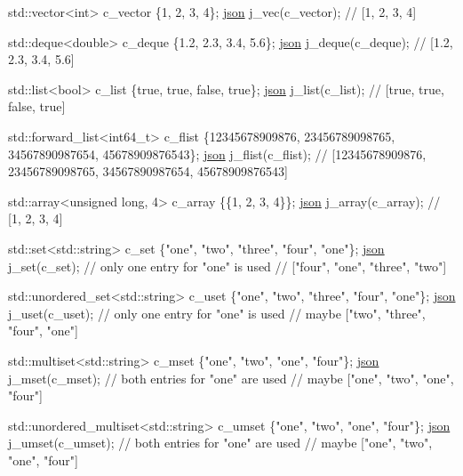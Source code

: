 \begin{DoxyCode}
std::vector<int> c\_vector \{1, 2, 3, 4\};
\hyperlink{classnlohmann_1_1basic__json}{json} j\_vec(c\_vector);
\textcolor{comment}{// [1, 2, 3, 4]}

std::deque<double> c\_deque \{1.2, 2.3, 3.4, 5.6\};
\hyperlink{classnlohmann_1_1basic__json}{json} j\_deque(c\_deque);
\textcolor{comment}{// [1.2, 2.3, 3.4, 5.6]}

std::list<bool> c\_list \{\textcolor{keyword}{true}, \textcolor{keyword}{true}, \textcolor{keyword}{false}, \textcolor{keyword}{true}\};
\hyperlink{classnlohmann_1_1basic__json}{json} j\_list(c\_list);
\textcolor{comment}{// [true, true, false, true]}

std::forward\_list<int64\_t> c\_flist \{12345678909876, 23456789098765, 34567890987654, 45678909876543\};
\hyperlink{classnlohmann_1_1basic__json}{json} j\_flist(c\_flist);
\textcolor{comment}{// [12345678909876, 23456789098765, 34567890987654, 45678909876543]}

std::array<unsigned long, 4> c\_array \{\{1, 2, 3, 4\}\};
\hyperlink{classnlohmann_1_1basic__json}{json} j\_array(c\_array);
\textcolor{comment}{// [1, 2, 3, 4]}

std::set<std::string> c\_set \{\textcolor{stringliteral}{"one"}, \textcolor{stringliteral}{"two"}, \textcolor{stringliteral}{"three"}, \textcolor{stringliteral}{"four"}, \textcolor{stringliteral}{"one"}\};
\hyperlink{classnlohmann_1_1basic__json}{json} j\_set(c\_set); \textcolor{comment}{// only one entry for "one" is used}
\textcolor{comment}{// ["four", "one", "three", "two"]}

std::unordered\_set<std::string> c\_uset \{\textcolor{stringliteral}{"one"}, \textcolor{stringliteral}{"two"}, \textcolor{stringliteral}{"three"}, \textcolor{stringliteral}{"four"}, \textcolor{stringliteral}{"one"}\};
\hyperlink{classnlohmann_1_1basic__json}{json} j\_uset(c\_uset); \textcolor{comment}{// only one entry for "one" is used}
\textcolor{comment}{// maybe ["two", "three", "four", "one"]}

std::multiset<std::string> c\_mset \{\textcolor{stringliteral}{"one"}, \textcolor{stringliteral}{"two"}, \textcolor{stringliteral}{"one"}, \textcolor{stringliteral}{"four"}\};
\hyperlink{classnlohmann_1_1basic__json}{json} j\_mset(c\_mset); \textcolor{comment}{// both entries for "one" are used}
\textcolor{comment}{// maybe ["one", "two", "one", "four"]}

std::unordered\_multiset<std::string> c\_umset \{\textcolor{stringliteral}{"one"}, \textcolor{stringliteral}{"two"}, \textcolor{stringliteral}{"one"}, \textcolor{stringliteral}{"four"}\};
\hyperlink{classnlohmann_1_1basic__json}{json} j\_umset(c\_umset); \textcolor{comment}{// both entries for "one" are used}
\textcolor{comment}{// maybe ["one", "two", "one", "four"]}
\end{DoxyCode}


